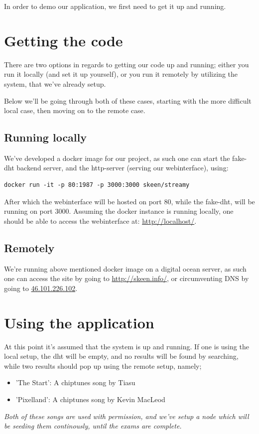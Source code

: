 In order to demo our application, we first need to get it up and running.

\section{Getting the code}
There are two options in regards to getting our code up and running; either you
run it locally (and set it up yourself), or you run it remotely by utilizing
the system, that we've already setup.

Below we'll be going through both of these cases, starting with the more 
difficult local case, then moving on to the remote case.

\subsection{Running locally}
We've developed a docker image for our project, as such one can start the 
fake-dht backend server, and the http-server (serving our webinterface), using:
\begin{verbatim}
docker run -it -p 80:1987 -p 3000:3000 skeen/streamy
\end{verbatim}
After which the webinterface will be hosted on port 80, while the fake-dht,
will be running on port 3000. Assuming the docker instance is running locally,
one should be able to access the webinterface at: \url{http://localhost/}.

\subsection{Remotely}
We're running above mentioned docker image on a digital ocean server, as such
one can access the site by going to \url{http://skeen.info/}, or circumventing
DNS by going to \url{46.101.226.102}.

\section{Using the application}
At this point it's assumed that the system is up and running. If one is using 
the local setup, the dht will be empty, and no results will be found by
searching, while two results should pop up using the remote setup, namely;
\begin{itemize}
\item 'The Start': A chiptunes song by Tiasu
\item 'Pixelland': A chiptunes song by Kevin MacLeod
\end{itemize}
{\em Both of these songs are used with permission, and we've setup a node which will
be seeding them continously, until the exams are complete.}

